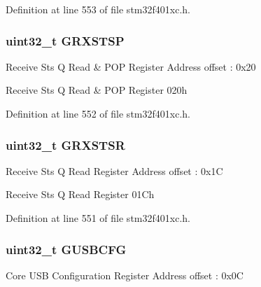 Definition at line 553 of file stm32f401xc.\+h.

\subsubsection[{\texorpdfstring{G\+R\+X\+S\+T\+SP}{GRXSTSP}}]{ uint32\+\_\+t G\+R\+X\+S\+T\+SP}\hypertarget{struct_u_s_b___o_t_g___global_type_def_a026f1fea708d42ed74b0bd8a488bc55e}{}\label{struct_u_s_b___o_t_g___global_type_def_a026f1fea708d42ed74b0bd8a488bc55e}
Receive Sts Q Read \& P\+OP Register Address offset \+: 0x20

Receive Sts Q Read \& P\+OP Register 020h 

Definition at line 552 of file stm32f401xc.\+h.

\subsubsection[{\texorpdfstring{G\+R\+X\+S\+T\+SR}{GRXSTSR}}]{ uint32\+\_\+t G\+R\+X\+S\+T\+SR}\hypertarget{struct_u_s_b___o_t_g___global_type_def_a9925d279a01c6e9713426315e2e44c87}{}\label{struct_u_s_b___o_t_g___global_type_def_a9925d279a01c6e9713426315e2e44c87}
Receive Sts Q Read Register Address offset \+: 0x1C

Receive Sts Q Read Register 01\+Ch 

Definition at line 551 of file stm32f401xc.\+h.

\subsubsection[{\texorpdfstring{G\+U\+S\+B\+C\+FG}{GUSBCFG}}]{ uint32\+\_\+t G\+U\+S\+B\+C\+FG}\hypertarget{struct_u_s_b___o_t_g___global_type_def_a0633538b8b7a6f1372d38938851bba87}{}\label{struct_u_s_b___o_t_g___global_type_def_a0633538b8b7a6f1372d38938851bba87}
Core U\+SB Configuration Register Address offset \+: 0x0C

